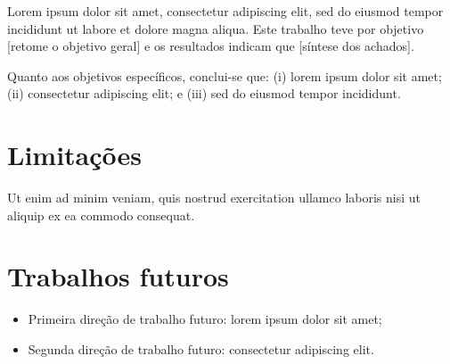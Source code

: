 
Lorem ipsum dolor sit amet, consectetur adipiscing elit, sed do eiusmod tempor
incididunt ut labore et dolore magna aliqua. Este trabalho teve por objetivo
[retome o objetivo geral] e os resultados indicam que [síntese dos achados].

Quanto aos objetivos específicos, conclui-se que: (i) lorem ipsum dolor sit amet;
(ii) consectetur adipiscing elit; e (iii) sed do eiusmod tempor incididunt.

\section{Limitações}

Ut enim ad minim veniam, quis nostrud exercitation ullamco laboris nisi ut
aliquip ex ea commodo consequat.

\section{Trabalhos futuros}

\begin{itemize}
  \item Primeira direção de trabalho futuro: lorem ipsum dolor sit amet;
  \item Segunda direção de trabalho futuro: consectetur adipiscing elit.
\end{itemize}
